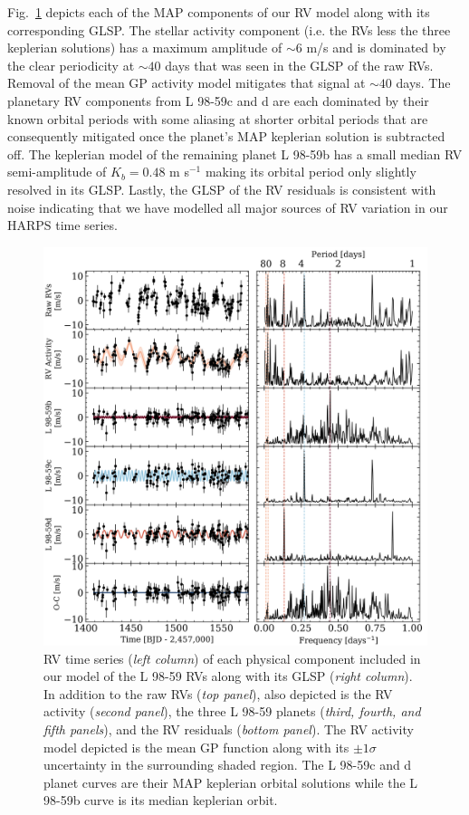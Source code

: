 \documentclass[longauth]{aa}
\newcommand{\mps}{m s$^{-1}$}
\begin{document}
Fig.~\ref{fig:rvcomponents} depicts each of the MAP components of our RV model along with its corresponding GLSP. The stellar activity component (i.e. the RVs less the three keplerian solutions) has a maximum amplitude of $\sim 6$ m/s and is dominated by the clear periodicity at $\sim 40$ days that was seen in the GLSP of the raw RVs. Removal of the mean GP activity model mitigates that signal at $\sim 40$ days. The planetary RV components from L 98-59c and d are each dominated by their known orbital periods with some aliasing at shorter orbital periods that are consequently mitigated once the planet's MAP keplerian solution is subtracted off. The keplerian model of the remaining planet L 98-59b has a small median RV semi-amplitude of $K_b = 0.48$ \mps{} making its orbital period only slightly resolved in its GLSP. Lastly, the GLSP of the RV residuals is consistent with noise indicating that we have modelled all major sources of RV variation in our HARPS time series.

\begin{figure}
    \centering
    \includegraphics[width=.9\hsize]{RVcomponentsfreq.png}
    \caption{RV time series (\emph{left column}) of each physical component included in our model of the L 98-59 RVs along with its GLSP (\emph{right column}). In addition to the raw RVs (\emph{top panel}), also depicted is the RV activity (\emph{second panel}), the three L 98-59 planets (\emph{third, fourth, and fifth panels}), and the RV residuals (\emph{bottom panel}). The RV activity model depicted is the mean GP function along with its $\pm 1\sigma$ uncertainty in the surrounding shaded region. The L 98-59c and d planet curves are their MAP keplerian orbital solutions while the L 98-59b curve is its median keplerian orbit.}
    \label{fig:rvcomponents}
\end{figure}
\end{document}
